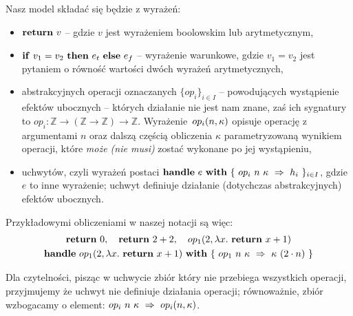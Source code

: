 \documentclass[shortabstract]{iithesis}
\begin{document}
Nasz model składać się będzie z wyrażeń:
\begin{itemize}
\item \(\mathbf{return}\ v\) -- gdzie \(v\) jest wyrażeniem boolowskim lub arytmetycznym,
\item \(\mathbf{if}\ v_1 = v_2\ \mathbf{then}\ e_t\ \mathbf{else}\ e_f\) -- wyrażenie warunkowe, gdzie \(v_1 = v_2\) jest pytaniem o równość wartości dwóch wyrażeń arytmetycznych,
\item abstrakcyjnych operacji oznaczanych \(\{op_i\}_{i \in I}\) -- powodujących wystąpienie efektów ubocznych -- których działanie nie jest nam znane, zaś ich sygnatury to \(op_i: \mathbb{Z} \rightarrow (\mathbb{Z} \rightarrow \mathbb{Z}) \rightarrow \mathbb{Z}\). Wyrażenie~\(op_{i}(n, \kappa)\) opisuje operację z argumentami \(n\) oraz dalszą częścią obliczenia \(\kappa\) parametryzowaną wynikiem operacji, które \textit{może (nie musi)} zostać wykonane po jej wystąpieniu,
\item uchwytów, czyli wyrażeń postaci \(\mathbf{handle}\ e\ \mathbf{with}\ \{\ op_i\ n\ \kappa\ \Rightarrow\ h_i\ \}_{i \in I}\), gdzie \(e\) to inne wyrażenie; uchwyt definiuje działanie (dotychczas abstrakcyjnych) efektów ubocznych. 
\end{itemize}

Przykładowymi obliczeniami w naszej notacji są więc:
\begin{equation}
\begin{gathered}
  \return{0},\quad\return{2 + 2},\quad \opi{1}{2}{\fun{x}{\return{x + 1}}} \\
  \handle{\opi{1}{2}{\fun{x}{\return{x + 1}}}}{\{\ \hcase{op_1}{n\ \kappa}{\kappa\ (2 \cdot n)} \ \}}
\end{gathered}
\end{equation}

Dla czytelności, pisząc w uchwycie zbiór który nie przebiega wszystkich operacji, przyjmujemy że uchwyt nie definiuje działania operacji; równoważnie, zbiór wzbogacamy o element: \(op_i\ n\ \kappa\ \Rightarrow\ op_i(n, \kappa)\).
\end{document}
